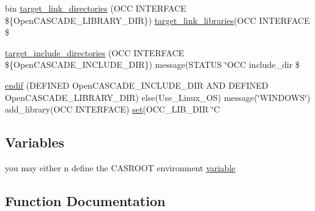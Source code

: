 \begin{DoxyCompactItemize}
\item 
bin \hyperlink{3rd__party_2OCC__dependency_2CMakeLists_8txt_aa12be1e2592a684fb2c3a4c71b41f7cb}{target\+\_\+link\+\_\+directories} (O\+CC I\+N\+T\+E\+R\+F\+A\+CE \$\{Open\+C\+A\+S\+C\+A\+D\+E\+\_\+\+L\+I\+B\+R\+A\+R\+Y\+\_\+\+D\+IR\}) \hyperlink{3rd__party_2Boost__dependency_2CMakeLists_8txt_a497ccbba6ff6df2ce1c4b839efbc42b9}{target\+\_\+link\+\_\+libraries}(O\+CC I\+N\+T\+E\+R\+F\+A\+CE \$
\item 
\hyperlink{3rd__party_2OCC__dependency_2CMakeLists_8txt_a7716dc48bda2b99d9e8cb80298ce1ce6}{target\+\_\+include\+\_\+directories} (O\+CC I\+N\+T\+E\+R\+F\+A\+CE \$\{Open\+C\+A\+S\+C\+A\+D\+E\+\_\+\+I\+N\+C\+L\+U\+D\+E\+\_\+\+D\+IR\}) message(S\+T\+A\+T\+US \char`\"{}O\+CC include\+\_\+dir \$
\item 
\hyperlink{3rd__party_2OCC__dependency_2CMakeLists_8txt_a49a9a7795e9d8c87a1813988236bb08b}{endif} (D\+E\+F\+I\+N\+ED Open\+C\+A\+S\+C\+A\+D\+E\+\_\+\+I\+N\+C\+L\+U\+D\+E\+\_\+\+D\+IR A\+ND D\+E\+F\+I\+N\+ED Open\+C\+A\+S\+C\+A\+D\+E\+\_\+\+L\+I\+B\+R\+A\+R\+Y\+\_\+\+D\+IR) else(Use\+\_\+\+Linux\+\_\+\+OS) message(\char`\"{}W\+I\+N\+D\+O\+WS\char`\"{}) add\+\_\+library(O\+CC I\+N\+T\+E\+R\+F\+A\+CE) \hyperlink{3rd__party_2OCC__dependency_2CMakeLists_8txt_a074553c33956a239810d7affac62c071}{set}(O\+C\+C\+\_\+\+L\+I\+B\+\_\+\+D\+IR \char`\"{}C
\end{DoxyCompactItemize}
\subsection*{Variables}
\begin{DoxyCompactItemize}
\item 
you may either n define the C\+A\+S\+R\+O\+OT environment \hyperlink{3rd__party_2OCC__dependency_2CMakeLists_8txt_a31b9582447f71bad0d8e48373021512f}{variable}
\end{DoxyCompactItemize}


\subsection{Function Documentation}
\mbox{\label{3rd__party_2OCC__dependency_2CMakeLists_8txt_a031f3c1a16f737d2532cb0cf3f76aaab}} 
